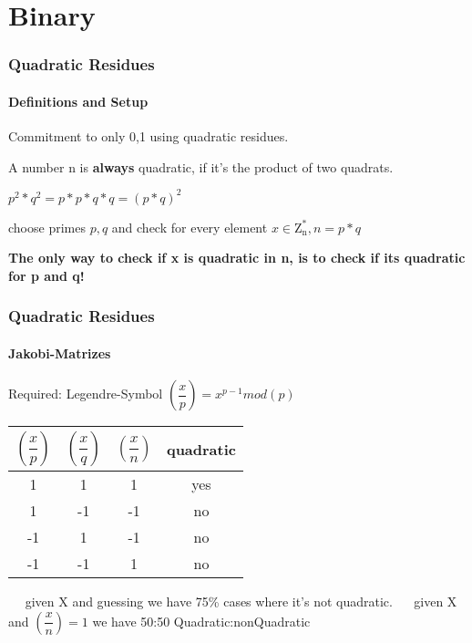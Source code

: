 \section{Binary}

\begin{frame}
	\frametitle{Quadratic Residues}
	\framesubtitle{Definitions and Setup}
	Commitment to only {0,1} using quadratic residues. ~\newline
	
	A number n is \textbf{always} quadratic, if it's the product of two quadrats. ~\newline
	\begin{center}
		$p^2 * q ^2 = p * p * q * q = (p*q)^2$ 
	\end{center}

	choose primes $p,q$ and check for every element $x \in \mathrm{Z_n^*} , n=p*q$ ~\newline ~\newline
	
	\textbf{The only way to check if x is quadratic in n, is to check if its quadratic for p and q!}
\end{frame}

\begin{frame}
	\frametitle{Quadratic Residues}
	\framesubtitle{Jakobi-Matrizes}
	Required: Legendre-Symbol $(\dfrac{x}{p}) = x^{p-1} mod(p)$ ~\newline ~\newline
	\begin{center}
			\begin{tabular}{|c|c|c|c|}
			\hline 
			$(\dfrac{x}{p})$&$(\dfrac{x}{q})$ &$(\dfrac{x}{n})$& quadratic \\ 
			\hline 
			1 & 1  & 1  & yes \\ 
			\hline 
			1 & -1  & -1  & no \\ 
			\hline 	
			-1 & 1  & -1  & no \\ 
			\hline 	
			-1 & -1  & 1  & no \\ 
			\hline 
		\end{tabular} 
	\end{center}
~\newline ~\newline
	given X and guessing we have 75\% cases where it's not quadratic. 
	~\newline ~\newline
	given X and $(\dfrac{x}{n})=1$ we have 50:50 Quadratic:nonQuadratic 
\end{frame}

